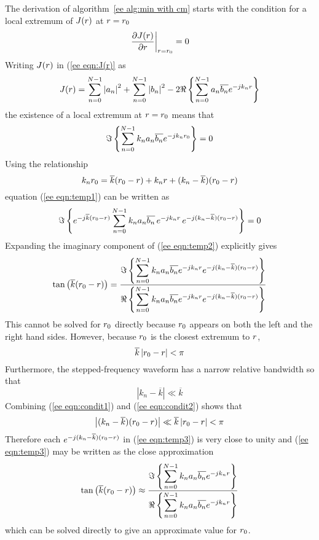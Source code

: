 The derivation of algorithm~\ref{ee alg:min with cm} starts with the condition
for a local extremum of $J({r})$ at ${r}={r}_0$
\begin{equation}
\left.\frac{{\partial} J({r})}{{\partial}{r}}\right|_{{r}={r}_0}=0
\end{equation}
Writing $J({r})$ in (\ref{ee eqn:J(r)} as
\begin{equation}
J({r})=\sum_{n=0}^{N-1} \left|a_n\right|^2+\sum_{n=0}^{N-1} \left|b_n\right|^2
-2\Re\left\{\sum_{n=0}^{N-1} a_n\overline{b_n}{e^{-jk_n{r}}}\right\}
\end{equation}
the existence of a local extremum at ${r}={r}_0$ means that
\begin{equation}\label{ee eqn:temp1}
\Im\left\{\sum_{n=0}^{N-1} k_na_n\overline{b_n}{e^{-jk_n{r}_0}}\right\}=0
\end{equation}
Using the relationship
\begin{equation}
k_n{r}_0=\overline{k}({r}_0-{r})+k_n{r}+(k_n-\overline{k})({r}_0-{r})
\end{equation}
equation (\ref{ee eqn:temp1}) can be written as
\begin{equation}\label{ee eqn:temp2}
\Im\left\{{e^{-j\overline{k}({r}_0-{r})}}
\sum_{n=0}^{N-1} k_na_n\overline{b_n}\,{e^{-jk_n{r}}}
\,{e^{-j(k_n-\overline{k})({r}_0-{r})}}\right\}=0
\end{equation}
Expanding the imaginary component of (\ref{ee eqn:temp2}) explicitly gives
\begin{equation}\label{ee eqn:temp3}
\tan\left(\overline{k}({r}_0-{r})\right)=
\frac{\displaystyle\Im\left\{\sum_{n=0}^{N-1} k_na_n\overline{b_n}{e^{-jk_n{r}}}
{e^{-j(k_n-\overline{k})({r}_0-{r})}}\right\}}
{\displaystyle\Re\left\{\sum_{n=0}^{N-1} k_na_n\overline{b_n}{e^{-jk_n{r}}}
{e^{-j(k_n-\overline{k})({r}_0-{r})}}\right\}}
\end{equation}
This cannot be solved for ${r}_0$ directly because ${r}_0$ appears on both 
the left and the right hand sides.  However, because ${r}_0$ is the closest 
extremum to ${r}$,
\begin{equation}\label{ee eqn:condit1}
\overline{k}\left|{r}_0-{r}\right|<\pi
\end{equation}
Furthermore, the stepped-frequency waveform has a narrow relative bandwidth
so that
\begin{equation}\label{ee eqn:condit2}
\left|k_n-\overline{k}\right|\ll\overline{k}
\end{equation}
Combining (\ref{ee eqn:condit1}) and (\ref{ee eqn:condit2}) shows that
\begin{equation}
\left|(k_n-\overline{k})({r}_0-{r})\right|\ll
\overline{k}\left|{r}_0-{r}\right|
<\pi
\end{equation}
Therefore each ${e^{-j(k_n-\overline{k})({r}_0-{r})}}$ in (\ref{ee eqn:temp3})
is very close to unity and (\ref{ee eqn:temp3}) may be written as the close
approximation
\begin{equation}
\tan\left(\overline{k}({r}_0-{r})\right)\approx
\frac{\displaystyle\Im\left\{\sum_{n=0}^{N-1} k_na_n\overline{b_n}{e^{-jk_n{r}}}\right\}}
{\displaystyle\Re\left\{\sum_{n=0}^{N-1} k_na_n\overline{b_n}{e^{-jk_n{r}}}\right\}}
\end{equation}
which can be solved directly to give an approximate value for ${r}_0$.

